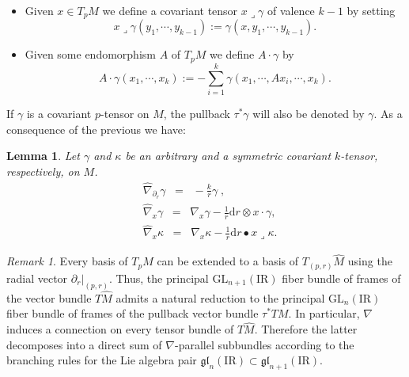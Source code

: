 \documentclass[11pt,a4paper]{article}
\theoremstyle{plain}
\newtheorem{lemma}{Lemma}
\theoremstyle{remark}
\newtheorem{remark}{Remark}
\newcommand{\GL}{\mathrm{GL}}
\newcommand{\gl}{\mathfrak{gl}}
\newcommand{\R}{\mathrm{I\!R}}
\renewcommand{\d}{\mathrm{d}}
\def\pd{\partial}
\begin{document}
\begin{itemize}
\item Given $x\in T_pM$ we define a covariant tensor $x\lrcorner \gamma$ of valence $k-1$ by setting
\begin{equation}\label{eq:x_einsetzen}
x\lrcorner \gamma (y_1,\cdots,y_{k-1}) := \gamma (x,y_1,\cdots,y_{k-1}).
\end{equation}
\item Given some endomorphism $A$ of $T_pM$ we define $A\cdot \gamma$ by 
\begin{equation}\label{eq:derivation}
A\cdot \gamma (x_1,\cdots,x_k) := - \sum_{i=1}^k \gamma(x_1,\cdots,A x_i,\cdots, x_k).
\end{equation}
\end{itemize}

If $\gamma$ is a covariant $p$-tensor on $M$, the pullback $\tau^*\gamma$ will 
also be denoted by $\gamma$. As a consequence of the previous we have:

\bigskip
\begin{lemma}
Let $\gamma$ and $\kappa$ be an arbitrary and a symmetric covariant $k$-tensor, respectively, on $M$.
\begin{align}\label{eq:hat_nabla_kappa_r}
& \hat\nabla_{\partial_r}\gamma\;\;=\;\;- \frac{k}{r} \gamma\;,\\
\label{eq:hat_nabla_gamma_x}
& \hat\nabla_{x}\gamma\;\;=\;\;\nabla_x \gamma - \frac{1}{r} \d r\otimes x \cdot \gamma,\\
\label{eq:hat_nabla_kappa_x}
& \hat\nabla_{x}\kappa\;\;=\;\;\nabla_x \kappa - \frac{1}{r}\d r \bullet x \lrcorner \kappa.
\end{align}
\end{lemma}



\bigskip
\begin{remark}\label{re:reduction}
Every basis of $T_pM$ can be extended to a basis of $T_{(p,r)}\hat M$ using the radial vector $\pd_r|_{(p,r)}$. 
Thus, the principal $\GL_{n+1}(\R)$ fiber bundle of frames of the vector bundle $T\hat M$ 
admits a natural reduction to the principal $\GL_n(\R)$ fiber bundle of frames of the pullback vector bundle $\tau^*TM$. In particular, $\nabla$ induces a connection on 
every tensor bundle of $T\hat M$. Therefore the latter decomposes into a direct sum of $\nabla$-parallel subbundles
according to the branching rules for the Lie algebra pair $\gl_n(\R)\subset \gl_{n+1}(\R)$.
\end{remark}
\end{document}
